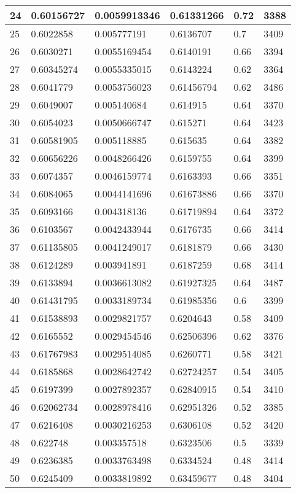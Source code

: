 \begin{longtable}{|l|l|l|l|l|l|}
24 & 0.60156727 & 0.0059913346 & 0.61331266 & 0.72 & 3388 \\ \hline 
25 & 0.6022858 & 0.005777191 & 0.6136707 & 0.7 & 3409 \\ \hline 
26 & 0.6030271 & 0.0055169454 & 0.6140191 & 0.66 & 3394 \\ \hline 
27 & 0.60345274 & 0.0055335015 & 0.6143224 & 0.62 & 3364 \\ \hline 
28 & 0.6041779 & 0.0053756023 & 0.61456794 & 0.62 & 3486 \\ \hline 
29 & 0.6049007 & 0.005140684 & 0.614915 & 0.64 & 3370 \\ \hline 
30 & 0.6054023 & 0.0050666747 & 0.615271 & 0.64 & 3423 \\ \hline 
31 & 0.60581905 & 0.005118885 & 0.615635 & 0.64 & 3382 \\ \hline 
32 & 0.60656226 & 0.0048266426 & 0.6159755 & 0.64 & 3399 \\ \hline 
33 & 0.6074357 & 0.0046159774 & 0.6163393 & 0.66 & 3351 \\ \hline 
34 & 0.6084065 & 0.0044141696 & 0.61673886 & 0.66 & 3370 \\ \hline 
35 & 0.6093166 & 0.004318136 & 0.61719894 & 0.64 & 3372 \\ \hline 
36 & 0.6103567 & 0.0042433944 & 0.6176735 & 0.66 & 3414 \\ \hline 
37 & 0.61135805 & 0.0041249017 & 0.6181879 & 0.66 & 3430 \\ \hline 
38 & 0.6124289 & 0.003941891 & 0.6187259 & 0.68 & 3414 \\ \hline 
39 & 0.6133894 & 0.0036613082 & 0.61927325 & 0.64 & 3487 \\ \hline 
40 & 0.61431795 & 0.0033189734 & 0.61985356 & 0.6 & 3399 \\ \hline 
41 & 0.61538893 & 0.0029821757 & 0.6204643 & 0.58 & 3409 \\ \hline 
42 & 0.6165552 & 0.0029454546 & 0.62506396 & 0.62 & 3376 \\ \hline 
43 & 0.61767983 & 0.0029514085 & 0.6260771 & 0.58 & 3421 \\ \hline 
44 & 0.6185868 & 0.0028642742 & 0.62724257 & 0.54 & 3405 \\ \hline 
45 & 0.6197399 & 0.0027892357 & 0.62840915 & 0.54 & 3410 \\ \hline 
46 & 0.62062734 & 0.0028978416 & 0.62951326 & 0.52 & 3385 \\ \hline 
47 & 0.6216408 & 0.0030216253 & 0.6306108 & 0.52 & 3420 \\ \hline 
48 & 0.622748 & 0.003357518 & 0.6323506 & 0.5 & 3339 \\ \hline 
49 & 0.6236385 & 0.0033763498 & 0.6334524 & 0.48 & 3414 \\ \hline 
50 & 0.6245409 & 0.0033819892 & 0.63459677 & 0.48 & 3404 \\ \hline 
\end{longtable}